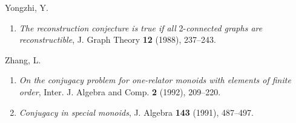\documentclass{surv-l}
\numberwithin{equation}{section}
\numberwithin{table}{section}
\numberwithin{figure}{section}
\theoremstyle{plain}
\theoremstyle{definition}
\begin{document}
\begin{thebibliography}{}
\item[] Yongzhi, Y.
\begin{enumerate}
\item \label{bib79} \emph{The reconstruction conjecture is true if all}
2-\emph{connected graphs are reconstructible}, J. Graph
Theory \textbf{12} (1988), 237--243.
\end{enumerate}

\item[] Zhang, L.
\begin{enumerate}
\item \label{bib80} \emph{On the conjugacy problem for one-relator monoids
with elements of finite order}, Inter. J. Algebra and
Comp. \textbf{2} (1992), 209--220.

\item \label{bib80a} \emph{Conjugacy in special monoids}, J. Algebra \textbf{143}
(1991), 487--497.
\end{enumerate}

\end{thebibliography}

\printindex
\end{document}
